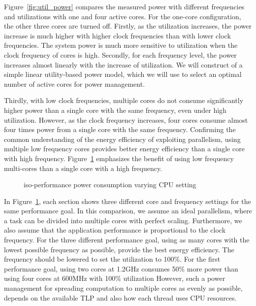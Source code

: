 Figure~\ref{fig:util_power} compares the measured power with different frequencies and utilizations with
one and four active cores. For the one-core configuration, the other three cores are turned off.
Firstly, as the utilization increases, the power increase is much higher
with higher clock frequencies than with lower clock frequencies. The system power is much more sensitive to
utilization when the clock frequency of cores is high.
Secondly, for each frequency level, the power increases almost linearly with the increase of utilization.
We will construct of a simple linear utility-based power model, which we will use to select an optimal
number of active cores for power management.

Thirdly, with low clock frequencies,
multiple cores do not consume significantly higher power than a single core with the same frequency, even under high utilization.
However, as the clock frequency increases, four cores consume almost four times power from a single core with
the same frequency. Confirming the common understanding of the energy efficiency of exploiting parallelism, 
using multiple low frequency cores provides better energy efficiency than a single core with high frequency. 
Figure~\ref{fig:1cpu_vs_2cpu} emphasizes the benefit of using low frequency multi-cores than
a single core with a high frequency. 

\begin{figure}[bt]
\begin{center}
\end{center}
\caption{iso-performance power consumption varying CPU setting}
\vspace{-0.1in}
\label{fig:1cpu_vs_2cpu}
\end{figure}

In Figure~\ref{fig:1cpu_vs_2cpu}, each section shows three different core and frequency settings
for the same performance goal. In this comparison, we assume an ideal parallelism, where
a task can be divided into multiple cores with perfect scaling. Furthermore, we also assume
that the application performance is proportional to the clock frequency.
For the three different performance goal, using as many cores with the lowest possible
frequency as possible, provide the best energy efficiency. The frequency should be 
lowered to set the utilization to 100\%. For the first performance goal,
using two cores at 1.2GHz consumes 50\% more power than using four cores at 600MHz with
100\% utilization 
However, such a power management for spreading computation to multiple cores as evenly as possible, depends
on the available TLP and also how each thread uses CPU resources. 

